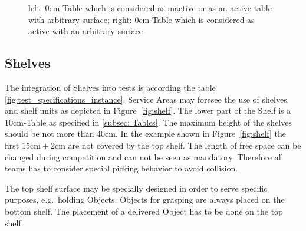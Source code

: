 \begin{figure} [h!]
		\begin{center}
			 \hspace{0.2cm}
		\end{center}
	\caption{left: $0\si{\centi\meter}$-Table which is considered as inactive or as an active table with arbitrary surface; right: $0\si{\centi\meter}$-Table which is considered as active with an arbitrary surface}
	\label{fig:0cmws}
\end{figure}

\subsection{Shelves}\label{sec:Shelves}

The integration of Shelves into tests is according the table \ref{fig:test_specifications_instance}. Service Areas may foresee the use of shelves and shelf units as depicted in Figure~\ref{fig:shelf}. The lower part of the Shelf is a $10\si{\centi\meter}$-Table as specified in \ref{subsec: Tables}.
The maximum height of the shelves should be not more than $40\si{\centi\meter}$. In the example shown in Figure~\ref{fig:shelf} the first $15 \si{\centi\meter}\pm 2\si{\centi\meter} $ are not covered by the top shelf. The length of free space can be changed during competition and can not be seen as mandatory. Therefore all teams has to consider special picking behavior to avoid collision.  

The top shelf surface may be specially designed in order to serve specific purposes, e.g.\, holding Objects. Objects for grasping are always placed on the bottom shelf. The placement of a delivered Object has to be done on the top shelf.  

